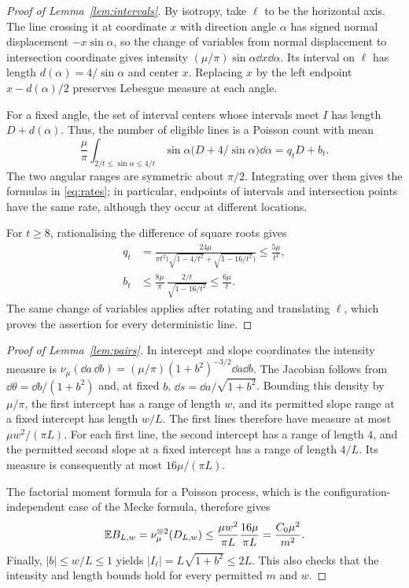 \documentclass[11pt,letterpaper]{article}
\begin{document}
\begin{proof}[Proof of Lemma~\ref{lem:intervals}]
By isotropy, take $\ell$ to be the horizontal axis. The line crossing it at coordinate $x$ with direction angle $\alpha$ has signed normal displacement $-x\sin\alpha$, so the change of variables from normal displacement to intersection coordinate gives intensity $(\mu/\pi)\sin\alpha\dd x\dd\alpha$. Its interval on $\ell$ has length $d(\alpha)=4/\sin\alpha$ and center $x$. Replacing $x$ by the left endpoint $x-d(\alpha)/2$ preserves Lebesgue measure at each angle.

For a fixed angle, the set of interval centers whose intervals meet $I$ has length $D+d(\alpha)$. Thus, the number of eligible lines is a Poisson count with mean
\[
 \frac{\mu}{\pi}\int_{2/t\le\sin\alpha\le4/t}
       \sin\alpha\big(D+4/\sin\alpha\big)\dd\alpha
       =q_tD+b_t.
\]
The two angular ranges are symmetric about $\pi/2$. Integrating over them gives the formulas in \eqref{eq:rates}; in particular, endpoints of intervals and intersection points have the same rate, although they occur at different locations.

For $t\ge8$, rationalising the difference of square roots gives
\[
\begin{aligned}
 q_t&=\frac{24\mu}{\pi t^2
           \big(\sqrt{1-4/t^2}+\sqrt{1-16/t^2}\big)}
           \le\frac{5\mu}{t^2},\\
 b_t&\le\frac{8\mu}{\pi}\,
         \frac{2/t}{\sqrt{1-16/t^2}}
         \le\frac{6\mu}{t}.
\end{aligned}
\]
The same change of variables applies after rotating and translating $\ell$, which proves the assertion for every deterministic line.
\end{proof}

\begin{proof}[Proof of Lemma~\ref{lem:pairs}]
In intercept and slope coordinates the intensity measure is
$\nu_\mu(\dd a\,\dd b)=(\mu/\pi)(1+b^2)^{-3/2}\dd a\dd b$. The Jacobian follows from $\dd\theta=\dd b/(1+b^2)$ and, at fixed $b$, $\dd s=\dd a/\sqrt{1+b^2}$. Bounding this density by $\mu/\pi$, the first intercept has a range of length $w$, and its permitted slope range at a fixed intercept has length $w/L$. The first lines therefore have measure at most $\mu w^2/(\pi L)$. For each first line, the second intercept has a range of length $4$, and the permitted second slope at a fixed intercept has a range of length $4/L$. Its measure is consequently at most $16\mu/(\pi L)$.

The factorial moment formula for a Poisson process, which is the configuration-independent case of the Mecke formula, therefore gives
\[
 \mathbb E B_{L,w}=\nu_\mu^{\otimes2}(D_{L,w})
 \le\frac{\mu w^2}{\pi L}\frac{16\mu}{\pi L}
 =\frac{C_0\mu^2}{m^2}.
\]
Finally, $|b|\le w/L\le1$ yields $|I_\ell|=L\sqrt{1+b^2}\le2L$. This also checks that the intensity and length bounds hold for every permitted $m$ and $w$.
\end{proof}
\end{document}
